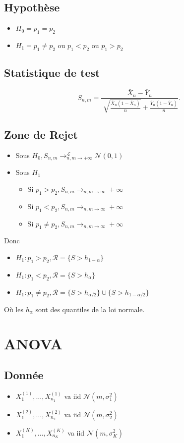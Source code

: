 \documentclass{article}
\theoremstyle{plain}%
\theoremstyle{definition}
\theoremstyle{remark}
\begin{document}
\subsection*{Hypothèse}
\begin{itemize}
    \item $ H_0 = p_1 = p_2 $ 
    \item $ H_1 = p_1 \neq p_2 $ ou $ p_1 < p_2 $ ou $ p_1 > p_2 $ 
\end{itemize}

\subsection*{Statistique de test}
\[
    S_{n,m} = \frac{\bar{X}_n - \bar{Y}_n}{\sqrt[]{ \frac{\bar{X}_n (1 - \bar{X}_n)}{n}} + \frac{\bar{Y}_n (1 - \bar{Y}_n)}{n}}
.\]

\subsection*{Zone de Rejet}
\begin{itemize}
    \item Sous $ H_0, S_{n,m} \to ^\mathcal{L}_{n,m \to +\infty } \mathcal{N}(0,1)$
    \item Sous $ H_1 $ \begin{itemize}
        \item Si $ p_1 > p_2, S_{n,m} \to_{n,m \to \infty } +\infty  $ 
        \item Si $ p_1 < p_2, S_{n,m} \to_{n,m \to \infty } +\infty  $ 
        \item Si $ p_1 \neq  p_2, S_{n,m} \to_{n,m \to \infty } +\infty  $ 
    \end{itemize}
\end{itemize}
Donc
\begin{itemize}
    \item $ H_1 : p_1 > p_2, \mathcal{R} = \{S > h_{1 -\alpha }\} $ 
    \item $ H_1 : p_1 < p_2, \mathcal{R} = \{S > h_{\alpha }\} $ 
    \item $ H_1 : p_1 \neq  p_2, \mathcal{R} = \{S > h_{\alpha /2}\} \cup \{S > h_{1 - \alpha /2}\} $ 
\end{itemize}
Où les $ h_{\alpha } $ sont des quantiles de la loi normale.

\section{ANOVA}
\subsection*{Donnée}
\begin{itemize}
    \item $ X_1^{(1)}, \dots, X_{n_1}^{(1)} $ va iid $ \mathcal{N}(m, \sigma_{1} ^2) $ 
    \item $ X_1^{(2)}, \dots, X_{n_2}^{(2)} $ va iid $ \mathcal{N}(m, \sigma_{2} ^2) $ 
    \item $ X_1^{(K)}, \dots, X_{n_K}^{(K)} $ va iid $ \mathcal{N}(m, \sigma_{K} ^2) $
\end{itemize}
\end{document}
